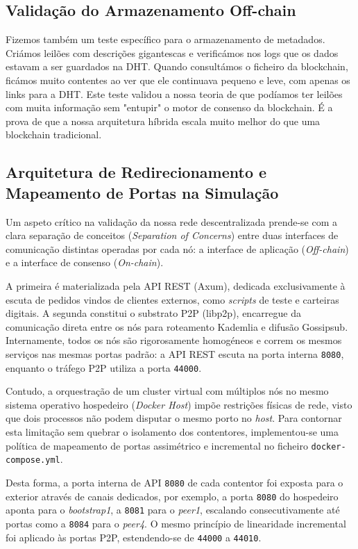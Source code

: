 \documentclass[11pt]{article}
\begin{document}
\subsection{Validação do Armazenamento Off-chain}
Fizemos também um teste específico para o armazenamento de metadados. Criámos leilões com descrições gigantescas e verificámos nos logs que os dados estavam a ser guardados na DHT. Quando consultámos o ficheiro da blockchain, ficámos muito contentes ao ver que ele continuava pequeno e leve, com apenas os links para a DHT. Este teste validou a nossa teoria de que podíamos ter leilões com muita informação sem "entupir" o motor de consenso da blockchain. É a prova de que a nossa arquitetura híbrida escala muito melhor do que uma blockchain tradicional.

\subsection{Arquitetura de Redirecionamento e Mapeamento de Portas na Simulação}
Um aspeto crítico na validação da nossa rede descentralizada prende-se com a clara separação de conceitos (\textit{Separation of Concerns}) entre duas interfaces de comunicação distintas operadas por cada nó: a interface de aplicação (\textit{Off-chain}) e a interface de consenso (\textit{On-chain}).

A primeira é materializada pela API REST (Axum), dedicada exclusivamente à escuta de pedidos vindos de clientes externos, como \textit{scripts} de teste e carteiras digitais. A segunda constitui o substrato P2P (libp2p), encarregue da comunicação direta entre os nós para roteamento Kademlia e difusão Gossipsub. Internamente, todos os nós são rigorosamente homogéneos e correm os mesmos serviços nas mesmas portas padrão: a API REST escuta na porta interna \texttt{8080}, enquanto o tráfego P2P utiliza a porta \texttt{44000}.

Contudo, a orquestração de um cluster virtual com múltiplos nós no mesmo sistema operativo hospedeiro (\textit{Docker Host}) impõe restrições físicas de rede, visto que dois processos não podem disputar o mesmo porto no \textit{host}. Para contornar esta limitação sem quebrar o isolamento dos contentores, implementou-se uma política de mapeamento de portas assimétrico e incremental no ficheiro \texttt{docker-compose.yml}.

Desta forma, a porta interna de API \texttt{8080} de cada contentor foi exposta para o exterior através de canais dedicados, por exemplo, a porta \texttt{8080} do hospedeiro aponta para o \textit{bootstrap1}, a \texttt{8081} para o \textit{peer1}, escalando consecutivamente até portas como a \texttt{8084} para o \textit{peer4}. O mesmo princípio de linearidade incremental foi aplicado às portas P2P, estendendo-se de \texttt{44000} a \texttt{44010}.
\end{document}
